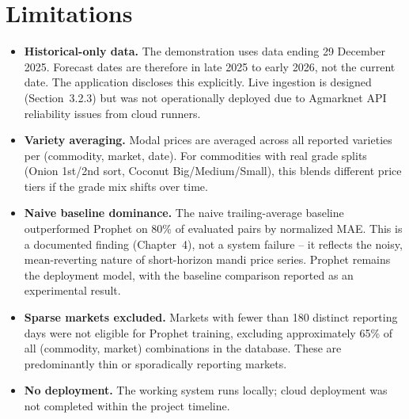 \section{Limitations}
\begin{itemize}
    \item \textbf{Historical-only data.} The demonstration uses data
    ending 29 December 2025. Forecast dates are therefore in late 2025
    to early 2026, not the current date. The application discloses this
    explicitly. Live ingestion is designed (Section~3.2.3) but was not
    operationally deployed due to Agmarknet API reliability issues from
    cloud runners.
    \item \textbf{Variety averaging.} Modal prices are averaged across
    all reported varieties per (commodity, market, date). For commodities
    with real grade splits (Onion 1st/2nd sort, Coconut Big/Medium/Small),
    this blends different price tiers if the grade mix shifts over time.
    \item \textbf{Naive baseline dominance.} The naive trailing-average
    baseline outperformed Prophet on 80\% of evaluated pairs by normalized
    MAE. This is a documented finding (Chapter~4), not a system failure --
    it reflects the noisy, mean-reverting nature of short-horizon mandi
    price series. Prophet remains the deployment model, with the baseline
    comparison reported as an experimental result.
    \item \textbf{Sparse markets excluded.} Markets with fewer than 180
    distinct reporting days were not eligible for Prophet training, excluding
    approximately 65\% of all (commodity, market) combinations in the
    database. These are predominantly thin or sporadically reporting markets.
    \item \textbf{No deployment.} The working system runs locally; cloud
    deployment was not completed within the project timeline.
\end{itemize}

